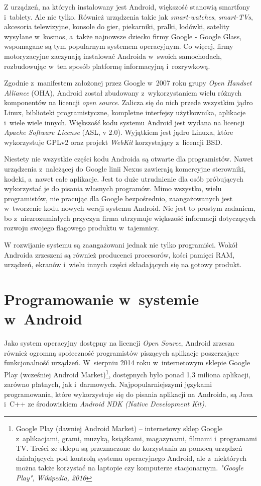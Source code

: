 Z urządzeń, na których instalowany jest Android, większość stanowią smartfony i~tablety. Ale nie tylko. Również urządzenia takie jak \textit{smart-watches}, \textit{smart-TVs}, akcesoria telewizyjne, konsole do gier, piekarniki, pralki, lodówki, satelity wysyłane w~kosmos, a~także najnowsze dziecko firmy Google - Google Glass, wspomagane są tym popularnym systemem operacyjnym. Co więcej, firmy motoryzacyjne zaczynają instalować Androida w~swoich samochodach, rozbudowując w~ten sposób platformę informacyjną i~rozrywkową.

Zgodnie z~manifestem założonej przez Google w~2007 roku grupy \textit{Open Handset Alliance} (OHA), Android został zbudowany z~wykorzystaniem wielu różnych komponentów na licencji \textit{open source}. Zalicza się do nich przede wszystkim jądro Linux, biblioteki programistyczne, kompletne interfejsy użytkownika, aplikacje i~wiele wiele innych. Większość kodu systemu Android jest wydana na licencji \textit{Apache Software License} (ASL, v 2.0). Wyjątkiem jest jądro Linuxa, które wykorzystuje GPLv2 oraz projekt \textit{WebKit} korzystający z~licencji BSD. 

Niestety nie wszystkie części kodu Androida są otwarte dla programistów. Nawet urządzenia z~należącej do Google linii Nexus zawierają komercyjne sterowniki, kodeki, a~nawet całe aplikacje. Jest to duże utrudnienie dla osób próbujących wykorzystać je do pisania własnych programów. Mimo wszystko, wielu programistów, nie pracując dla Google bezpośrednio, zaangażowanych jest w~tworzenie kodu nowych wersji systemu Android. Nie jest to prostym zadaniem, bo z~niezrozumiałych przyczyn firma utrzymuje większość informacji dotyczących rozwoju swojego flagowego produktu w~tajemnicy.

W rozwijanie systemu są zaangażowani jednak nie tylko programiści. Wokół Androida zrzeszeni są również producenci procesorów, kości pamięci RAM, urządzeń, ekranów i~wielu innych części składających się na gotowy produkt.

\section{Programowanie w~systemie w~Android}
Jako system operacyjny dostępny na licencji \textit{Open Source}, Android zrzesza również ogromną społeczność programistów piszących aplikacje poszerzające funkcjonalność urządzeń. W~sierpniu 2014 roku w~internetowym sklepie Google Play (wcześniej Android Market)\footnote{Google Play (dawniej Android Market) – internetowy sklep Google z~aplikacjami, grami, muzyką, książkami, magazynami, filmami i~programami TV. Treści ze sklepu są przeznaczone do korzystania za pomocą urządzeń działających pod kontrolą systemu operacyjnego Android, ale z~niektórych można także korzystać na laptopie czy komputerze stacjonarnym. \textit{"Google Play", Wikipedia, 2016}}, dostępnych było ponad 1,3 miliona aplikacji, zarówno płatnych, jak i~darmowych. Najpopularniejszymi językami programowania, które wykorzystuje się do pisania aplikacji na Androida, są Java i~C++ ze środowiskiem \textit{Android NDK (Native Development Kit)}. 

